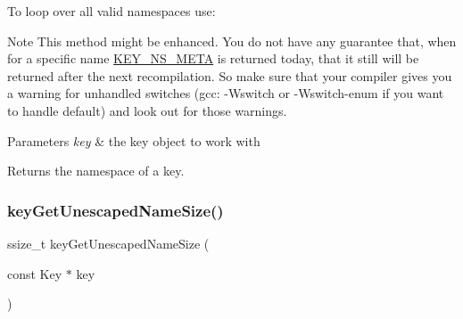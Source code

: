  To loop over all valid namespaces use\+: 
\begin{DoxyCodeInclude}{0}
\DoxyCodeLine{\{}
\DoxyCodeLine{        \textcolor{comment}{// work with namespace}}
\DoxyCodeLine{\}}
\end{DoxyCodeInclude}
 \begin{DoxyNote}{Note}
This method might be enhanced. You do not have any guarantee that, when for a specific name \mbox{\hyperlink{group__key_ggaec3b8d6f430ae49b91bafe8a86310a68ac5fbf2c3a7ae79fa2d60c48ae3e72688}{K\+E\+Y\+\_\+\+N\+S\+\_\+\+M\+E\+TA}} is returned today, that it still will be returned after the next recompilation. So make sure that your compiler gives you a warning for unhandled switches (gcc\+: -\/Wswitch or -\/Wswitch-\/enum if you want to handle default) and look out for those warnings.
\end{DoxyNote}

\begin{DoxyParams}{Parameters}
{\em key} & the key object to work with \\
\hline
\end{DoxyParams}
\begin{DoxyReturn}{Returns}
the namespace of a key. 
\end{DoxyReturn}
\mbox{\label{group__keyname_ga5e7eff0c77678420199d0d2e8729152b}} 
\subsubsection{\texorpdfstring{keyGetUnescapedNameSize()}{keyGetUnescapedNameSize()}}
{\footnotesize\ttfamily ssize\+\_\+t key\+Get\+Unescaped\+Name\+Size (\begin{DoxyParamCaption}\item[{const Key $\ast$}]{key }\end{DoxyParamCaption})}



